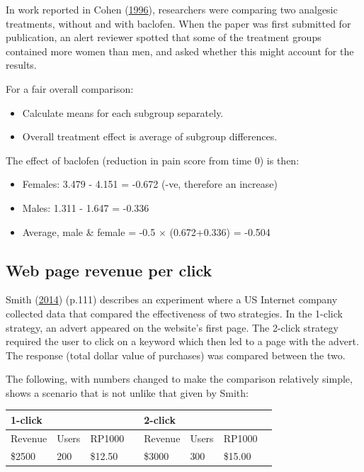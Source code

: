 \documentclass[
  10pt,
  b5paper]{book}
\providecommand{\tightlist}{%
  \setlength{\itemsep}{0pt}\setlength{\parskip}{0pt}}
\begin{document}
In work reported in Cohen (\protect\hyperlink{ref-cohen1996}{1996}), researchers were comparing two analgesic treatments, without and with baclofen. When the paper was first submitted for publication, an alert reviewer spotted that some of the treatment groups contained more women than men, and asked whether this might account for the results.

For a fair overall comparison:

\begin{itemize}
\tightlist
\item
  Calculate means for each subgroup separately.
\item
  Overall treatment effect is average of subgroup differences.
\end{itemize}

The effect of baclofen (reduction in pain score from time 0) is then:

\begin{itemize}
\tightlist
\item
  Females: 3.479 - 4.151 = -0.672 (-ve, therefore an increase)
\item
  Males: 1.311 - 1.647 = -0.336
\item
  Average, male \& female = -0.5 \(\times\) (0.672+0.336) = -0.504
\end{itemize}

\hypertarget{web-page-revenue-per-click}{%
\subsection*{Web page revenue per click}\label{web-page-revenue-per-click}}

Smith (\protect\hyperlink{ref-smith-sd}{2014}) (p.111) describes an experiment where a US Internet company collected data that compared the effectiveness of two strategies. In the 1-click strategy, an advert appeared on the website's first page. The 2-click strategy required the user to click on a keyword which then led to a page with the advert. The response (total dollar value of purchases) was compared between the two.

The following, with numbers changed to make the comparison relatively simple, shows a scenario that is not unlike that given by Smith:

\begin{longtable}[]{@{}llllllll@{}}
\toprule\noalign{}
1-click & & & & 2-click & & & \\
\midrule\noalign{}
\endhead
\bottomrule\noalign{}
\endlastfoot
Revenue & Users & RP1000 & & Revenue & Users & RP1000 & \\
\$2500 & 200 & \$12.50 & & \$3000 & 300 & \$15.00 & \\
\end{longtable}
\end{document}
